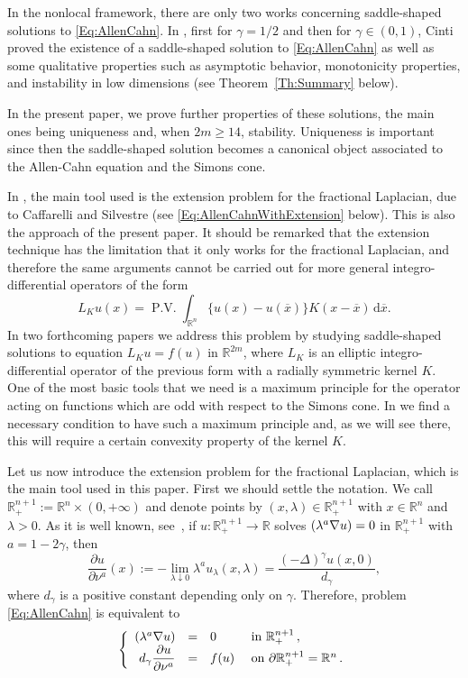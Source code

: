 \documentclass[12pt,reqno]{amsart}
\theoremstyle{definition}
\theoremstyle{remark}
\newcommand{\con}[1]{\mathbb{#1}}
\newcommand{\R}{\con{R}} %
\newcommand{\s}{\gamma}
\newcommand{\fraclaplacian}{(-\Delta)^\s}
\renewcommand{\d}{\,\mathrm{d}} %
\newcommand\beqc[1]{\left\{\begin{array}{#1}}
\newcommand\eeqc{\end{array} \right.}
\def\PDEsystem{rcll}
\DeclareMathOperator{\PV}{P.V.}
\let\div\relax
\DeclareMathOperator{\div}{div}
\numberwithin{equation}{section}
\begin{document}
In the nonlocal framework, there are only two works concerning saddle-shaped solutions to \eqref{Eq:AllenCahn}. In  \cite{Cinti-Saddle,Cinti-Saddle2}, first for $\s=1/2$ and then for $\s\in(0,1)$, Cinti proved the existence of a saddle-shaped solution to \eqref{Eq:AllenCahn} as well as some qualitative properties such as asymptotic behavior, monotonicity properties, and instability in low dimensions (see Theorem~\ref{Th:Summary} below). 

In the present paper, we prove further properties of these solutions, the main ones being uniqueness and, when $2m\geq 14$, stability. Uniqueness is important since then the saddle-shaped solution becomes a canonical object associated to the Allen-Cahn equation and the Simons cone. 

In \cite{Cinti-Saddle,Cinti-Saddle2}, the main tool used is the extension problem for the fractional Laplacian, due to Caffarelli and Silvestre \cite{CaffarelliSilvestre} (see \eqref{Eq:AllenCahnWithExtension} below). This is also the approach of the present paper. It should be remarked that the extension technique has the limitation that it only works for the fractional Laplacian, and therefore the same arguments cannot be carried out for more general integro-differential operators of the form
$$
L_K u(x) = \PV \int_{\R^n} \{u(x) - u(\overline{x})\} K(x-\overline{x})\d \overline{x}.
$$
In two forthcoming papers \cite{FelipeSanz-Perela:IntegroDifferentialI,FelipeSanz-Perela:IntegroDifferentialII} we address this problem by studying saddle-shaped solutions to equation $L_K u = f(u)$ in $\R^{2m}$, where $L_K$ is an elliptic integro-differential operator of the previous form with a radially symmetric kernel $K$. One of the most basic tools that we need is a maximum principle for the operator acting on  functions which are odd with respect to the Simons cone. In \cite{FelipeSanz-Perela:IntegroDifferentialI} we find a necessary condition to have such a maximum principle and, as we will see there, this will require a certain convexity property of the kernel $K$.

Let us now introduce the extension problem for the fractional Laplacian, which is the main tool used in this paper. First we should settle the notation. We call $\R^{n+1}_+ := \R^n \times (0, +\infty)$ and denote points by $(x,\lambda)\in \R^{n+1}_+$ with $x\in \R^n$ and $\lambda > 0$. As it is well known, see~\cite{CaffarelliSilvestre}, if $u:\R^{n+1}_+ \to \R$ solves $\div(\lambda^a \nabla u) = 0$ in $\R^{n+1}_+$ with $a=1-2\s$, then
$$
\dfrac{\partial u}{\partial \nu^a} (x) := -\lim_{\lambda \downarrow 0} \lambda^a u_\lambda (x, \lambda) = \dfrac{\fraclaplacian u (x,0)}{d_\s},
$$
where $d_\s$ is a positive constant depending only on $\s$. Therefore, problem \eqref{Eq:AllenCahn} is equivalent to
\begin{equation}
\label{Eq:AllenCahnWithExtension}
\beqc{\PDEsystem}
\div(\lambda^a \nabla u) &=& 0 & \textrm{ in } \R^{n+1}_+\,, \\
d_\s \dfrac{\partial u}{\partial \nu^a} &=& f(u) & \textrm{ on } \partial \R^{n+1}_+ = \R^n\,.
\eeqc
\end{equation}
\end{document}
